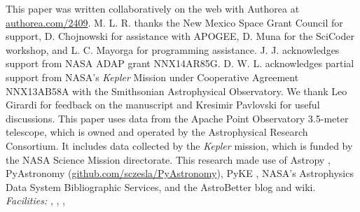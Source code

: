 \acknowledgments
This paper was written collaboratively on the web with Authorea at \url{authorea.com/2409}. M. L. R. thanks the New Mexico Space Grant Council for support, D. Chojnowski for assistance with APOGEE, D. Muna for the SciCoder workshop, and L. C. Mayorga for programming assistance. J. J. acknowledges support from NASA ADAP grant NNX14AR85G. D. W. L. acknowledges partial support from NASA's \emph{Kepler} Mission under Cooperative Agreement NNX13AB58A with the Smithsonian Astrophysical Observatory. We thank Leo Girardi for feedback on the manuscript and Kresimir Pavlovski for useful discussions. This paper uses data from the Apache Point Observatory 3.5-meter telescope, which is owned and operated by the Astrophysical Research Consortium. It includes data collected by the \emph{Kepler} mission, which is funded by the NASA Science Mission directorate. This research made use of Astropy \citep{astropy}, PyAstronomy (\url{github.com/sczesla/PyAstronomy}), PyKE \citep{pyke}, NASA's Astrophysics Data System Bibliographic Services, and the AstroBetter blog and wiki.
\\

{\it Facilities:} , , , 

  